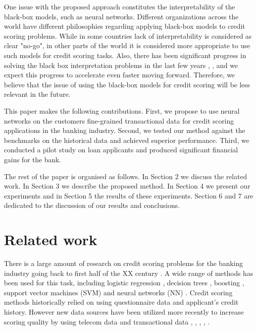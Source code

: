 \documentclass[sigconf]{acmart}
\begin{document}
One issue with the proposed approach constitutes the interpretability of the black-box models, such as neural networks.
Different organizations across the world have different philosophies regarding applying black-box models to credit scoring problems. While in some countries lack of interpretability is considered as clear "no-go", in other parts of the world it is considered more appropriate to use such models for credit scoring tasks. Also, there has been significant progress in solving the black box interpretation problems in the last few years \cite{DBLP:journals/corr/ChoiBSSS16}, \cite{gupta2018lisa}, \cite{mccoy2018rnns} and we expect this progress to accelerate even faster moving forward. Therefore, we believe that the issue of using the black-box models for credit scoring will be less relevant in the future.

This paper makes the following contributions.
First, we propose to use neural networks on the customers fine-grained transactional data for credit scoring applications in the banking industry.
Second, we tested our method against the benchmarks on the historical data and achieved superior performance.
Third, we conducted a pilot study on loan applicants and produced significant financial gains for the bank.

The rest of the paper is organised as follows. In Section 2 we discuss the related work. In Section 3 we describe the proposed method. In Section 4 we present our experiments and in Section 5 the results of these experiments. Section 6 and 7 are dedicated to the discussion of our results and conclusions.

\section{Related work} \label{sec-rw}

There is a large amount of research on credit scoring problems for the banking industry going back to first half of the XX century \cite{NBERc12952}. A wide range of methods has been used for this task, including logistic regression \cite{RePEc:cup:jfinqa:v:15:y:1980:i:03:p:757-770_00}, decision trees \cite{makowski1985credit}, boosting \cite{Bastos2008CreditSW}, support vector machines (SVM) \cite{HUANG2007847} and neural networks (NN) \cite{west2000neural}. Credit scoring methods historically relied on using questionnaire data and applicant's credit history. However new data sources have been utilized more recently to increase scoring quality by using telecom data \cite{bjorkegren2017behavior} and transactional data \cite{khandani2010consumer}, \cite{bellotti2013forecasting}, \cite{KVAMME2018207}, \cite{chi2012hybrid}, \cite{RePEc}.
\end{document}
